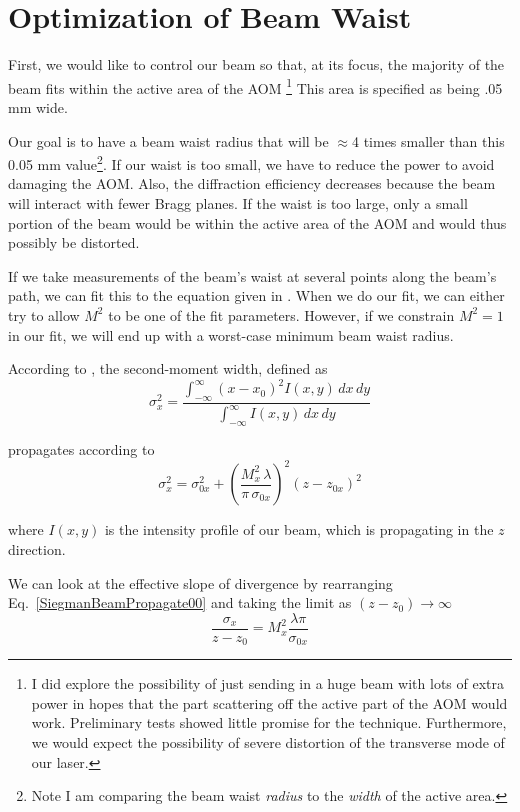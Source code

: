 \section{Optimization of Beam Waist}
First, we would like to control our beam so that, at its focus, the majority of the beam fits within the active area of the AOM \footnote{I did explore the possibility of just sending in a huge beam with lots of extra power in hopes that the part scattering off the active part of the AOM would work. Preliminary tests showed little promise for the technique. Furthermore, we would expect the possibility of severe distortion of the transverse mode of our laser.} This area is specified as being .05 mm wide. 

Our goal is to have a beam waist radius that will be $\approx$4 times smaller than this 0.05 mm value\footnote{Note I am comparing the beam waist \emph{radius} to the \emph{width} of the active area.}. If our waist is too small, we have to reduce the power to avoid damaging the AOM. Also, the diffraction efficiency decreases because the beam will interact with fewer Bragg planes. If the waist is too large, only a small portion of the beam would be within the active area of the AOM and would thus possibly be distorted. 

If we take measurements of the beam's waist at several points along the beam's path, we can fit this to the equation given in \cite{SiegmanBeamQuality}. When we do our fit, we can either try to allow $M^2$ to be one of the fit parameters. However, if we constrain $M^2=1$ in our fit, we will end up with a worst-case minimum beam waist radius. 

According to \cite{SiegmanBeamQuality}, the second-moment width, defined as 
\begin{equation}
\sigma_x^2=\frac{\int_{-\infty}^{\infty} (x-x_0)^2 I(x,y)\, dx\, dy}{\int_{-\infty}^{\infty} I(x,y)\, dx \, dy}
\end{equation} 

propagates according to 
\begin{equation}
\sigma_x^2=\sigma_{0x}^2+\left( \frac{M_x^2 \,\lambda}{\pi \, \sigma_{0x}}\right)^2 (z-z_{0x})^2 \label{SiegmanBeamPropagate00}
\end{equation}
 
where $I(x,y)$ is the intensity profile of our beam, which is propagating in the $z$ direction. 

We can look at the effective slope of divergence by rearranging Eq.\ \ref{SiegmanBeamPropagate00} and taking the limit as $(z-z_0) \rightarrow \infty$
\begin{equation}
\frac{\sigma_x}{z-z_0}=M_x^2 \frac{\lambda \pi}{\sigma_{0x}} \label{SiegmanBeamSlope}
\end{equation}

